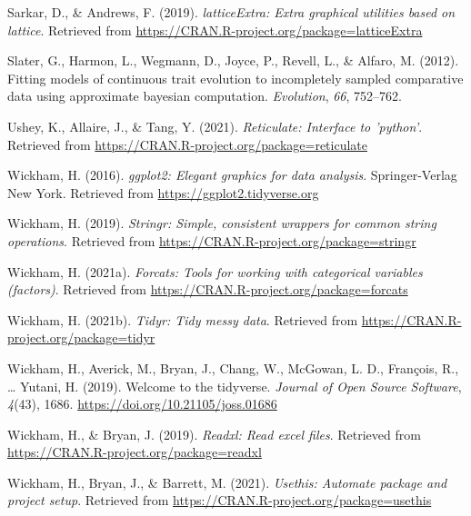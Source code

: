 \documentclass[
  english,
  man]{apa6}
\newlength{\cslhangindent}
\newlength{\cslentryspacingunit} %
\newenvironment{CSLReferences}[2] %
 {%
  \setlength{\parindent}{0pt}
  \ifodd #1
  \let\oldpar\par
  \def\par{\hangindent=\cslhangindent\oldpar}
  \fi
  \setlength{\parskip}{#2\cslentryspacingunit}
 }%
 {}
\begin{document}
\begin{CSLReferences}{1}{0}
\leavevmode{}%
Sarkar, D., \& Andrews, F. (2019). \emph{latticeExtra: Extra graphical utilities based on lattice}. Retrieved from \url{https://CRAN.R-project.org/package=latticeExtra}

\leavevmode{}%
Slater, G., Harmon, L., Wegmann, D., Joyce, P., Revell, L., \& Alfaro, M. (2012). Fitting models of continuous trait evolution to incompletely sampled comparative data using approximate bayesian computation. \emph{Evolution}, \emph{66}, 752--762.

\leavevmode{}%
Ushey, K., Allaire, J., \& Tang, Y. (2021). \emph{Reticulate: Interface to 'python'}. Retrieved from \url{https://CRAN.R-project.org/package=reticulate}

\leavevmode{}%
Wickham, H. (2016). \emph{ggplot2: Elegant graphics for data analysis}. Springer-Verlag New York. Retrieved from \url{https://ggplot2.tidyverse.org}

\leavevmode{}%
Wickham, H. (2019). \emph{Stringr: Simple, consistent wrappers for common string operations}. Retrieved from \url{https://CRAN.R-project.org/package=stringr}

\leavevmode{}%
Wickham, H. (2021a). \emph{Forcats: Tools for working with categorical variables (factors)}. Retrieved from \url{https://CRAN.R-project.org/package=forcats}

\leavevmode{}%
Wickham, H. (2021b). \emph{Tidyr: Tidy messy data}. Retrieved from \url{https://CRAN.R-project.org/package=tidyr}

\leavevmode{}%
Wickham, H., Averick, M., Bryan, J., Chang, W., McGowan, L. D., François, R., \ldots{} Yutani, H. (2019). Welcome to the {tidyverse}. \emph{Journal of Open Source Software}, \emph{4}(43), 1686. \url{https://doi.org/10.21105/joss.01686}

\leavevmode{}%
Wickham, H., \& Bryan, J. (2019). \emph{Readxl: Read excel files}. Retrieved from \url{https://CRAN.R-project.org/package=readxl}

\leavevmode{}%
Wickham, H., Bryan, J., \& Barrett, M. (2021). \emph{Usethis: Automate package and project setup}. Retrieved from \url{https://CRAN.R-project.org/package=usethis}


\end{CSLReferences}
\end{document}

